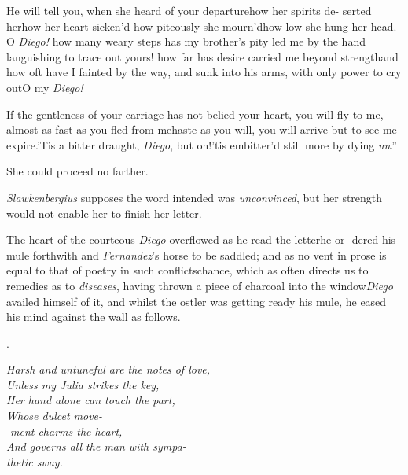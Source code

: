 \documentclass{article}
\begin{document}
\indent\lqq He will tell you, when she heard\break
\lqq of your departure\tsk how her spirits de-\break
\lqq serted her\tsk how her heart sicken’d\tsk\break
\lqq how piteously she mourn’d\tsh how low\break
\lqq she hung her head. O \textit{Diego!} how\break
\lqq many weary steps has my brother’s\break
\lqq pity led me by the hand languishing\break
\lqq to trace out yours! how far has desire\break
\lqq carried me beyond strength\tsh and how
\lqq oft have I fainted by the way, and\break
\lqq sunk into his arms, with only power\break
\lqq to cry out\tsk O my \textit{Diego!}

\indent\lqq If the gentleness of your carriage\break
\lqq has not belied your heart, you will fly\break
\lqq to me, almost as fast as you fled from\break
\lqq me\tsk haste as you will, you will arrive\break
\lqq but to see me expire.\tsk ’Tis a bitter\break
\lqq draught, \textit{Diego}, but oh!\@ ’tis embitter’d\break
\lqq still more by dying \textit{un}\tsh.”

She could proceed no farther.

\textit{Slawkenbergius} supposes the word intended was
\textit{unconvinced}, but her strength would not enable her to finish her
letter.

The heart of the courteous \textit{Diego}\break
overflowed as he read the letter\tsk he or-\break
dered his mule forthwith and
\textit{Fernandez}’s horse
to be saddled; and as no vent in
prose is equal to that of poetry in such
conflicts\tsk chance, which as often directs us to
remedies as to \textit{diseases}, having thrown a piece of charcoal
into the window\tsh \textit{Diego} availed himself of it,
and whilst the ostler was getting ready his mule, he eased his
mind against the wall as follows.

\bigskip
\centerline{.}
\parskip
\bgroup\itshape\noindent
\null\quad Harsh and untuneful are the notes of love,\\
\null\qquad Unless my Julia strikes the key,\\
\null\quad Her hand alone can touch the part,\\
\null\qquad Whose dulcet move-\\
\null\quad -ment charms the heart,\\
\null\qquad And governs all the man with sympa-\\
\null\qquad\quad thetic sway.
\par\egroup
\end{document}
